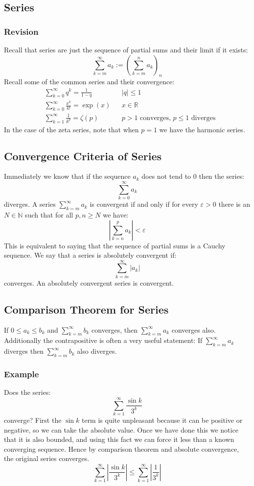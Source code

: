 \documentclass[12pt]{article}
\begin{document}
\subsection{Series}
\subsubsection*{Revision}
Recall that series are just the sequence of partial sums and their limit if it exists:
\[\sum^\infty_{k=m}a_k:=\left(\sum^n_{k=m}a_k\right)_n\]
Recall some of the common series and their convergence:
\begin{align*}
    &\sum^\infty_{k=0}q^k=\frac{1}{1-q} && |q|\leq 1 \\
    &\sum^\infty_{k=0}\frac{x^k}{k!}=\exp(x) && x\in\mathbb{R} \\
    &\sum^\infty_{k=1}\frac{1}{k^p}=\zeta(p)&&p>1 \text{ converges, } p\leq1 \text{ diverges} 
\end{align*}
In the case of the zeta series, note that when \(p=1\) we have the harmonic series.
\subsection{Convergence Criteria of Series}
Immediately we know that if the sequence \(a_k\) does not tend to \(0\) then the series:
\[\sum^\infty_{k=0}a_k\]
diverges. A series \(\sum^\infty_{k=m}a_k\) is convergent if and only if for every \(\varepsilon>0\) there is an \(N\in\mathbb{N}\) such that for all \(p,n\geq N\) we have:
\[\left|\sum^p_{k=n}a_k\right|<\varepsilon\]
This is equivalent to saying that the sequence of partial sums is a Cauchy sequence. We say that a series is absolutely convergent if:
\[\sum^\infty_{k=m}|a_k|\]
converges. An absolutely convergent series is convergent.
\subsection{Comparison Theorem for Series}
If \(0\leq a_k\leq b_k\) and \(\sum^\infty_{k=m}b_k\) converges, then \(\sum^\infty_{k=m}a_k\) converges also. Additionally the contrapositive is often a very useful statement: If \(\sum^\infty_{k=m}a_k\) diverges then \(\sum^\infty_{k=m}b_k\) also diverges.
\subsubsection*{Example}
Does the series:
\[\sum^\infty_{k=1}\frac{\sin k}{3^k}\]
converge? First the \(\sin k\) term is quite unpleasant because it can be positive or negative, so we can take the absolute value. Once we have done this we notice that it is also bounded, and using this fact we can force it less than a known converging sequence. Hence by comparison theorem and absolute convergence, the original series converges.
\[\sum^\infty_{k=1}\left|\frac{\sin k}{3^k}\right|\leq \sum^\infty_{k=1}\left|\frac{1}{3^k}\right|\]
\end{document}
